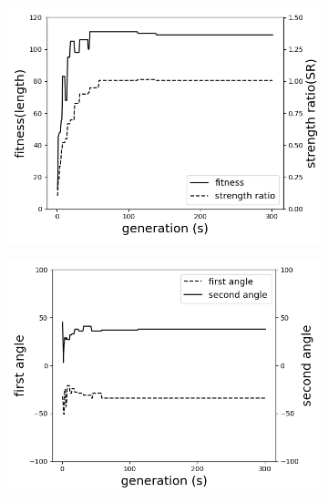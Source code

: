\documentclass{article}
\begin{document}
\begin{figure}[!t]
	\centering
		\begin{subfigure}[b]{0.8\linewidth}
			\includegraphics[width=\linewidth]{2020-11-10-pre-image/two_distinct_angle_fitness_and_sr.png}
		\end{subfigure}

		\begin{subfigure}[b]{0.8\linewidth}
			\includegraphics[width=\linewidth]{2020-11-10-pre-image/two_distinct_angle_angle_change.png}
		\end{subfigure}


\end{figure}
\end{document}
